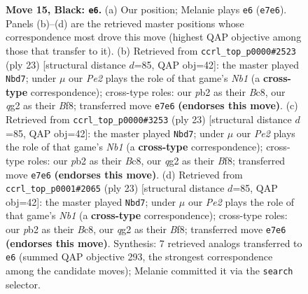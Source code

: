 \documentclass[11pt]{article}
\begin{document}
\begin{figure}[p]
\caption{\textbf{Move 15, Black: \texttt{e6}.} (a) Our position; Melanie plays \texttt{e6} (\texttt{e7e6}). Panels (b)--(d) are the retrieved master positions whose correspondence most drove this move (highest QAP objective among those that transfer to it). (b) Retrieved from \texttt{ccrl\_top\_p0000\#2523} (ply 23) [structural distance $d$=85, QAP obj=42]: the master played \texttt{Nbd7}; under $\mu$ our \emph{Pe2} plays the role of that game's \emph{Nb1} (a \textbf{cross-type} correspondence); cross-type roles: our \emph{p}b2 as their \emph{B}c8, our \emph{q}g2 as their \emph{B}f8; transferred move \texttt{e7e6} \textbf{(endorses this move)}. (c) Retrieved from \texttt{ccrl\_top\_p0000\#3253} (ply 23) [structural distance $d$=85, QAP obj=42]: the master played \texttt{Nbd7}; under $\mu$ our \emph{Pe2} plays the role of that game's \emph{Nb1} (a \textbf{cross-type} correspondence); cross-type roles: our \emph{p}b2 as their \emph{B}c8, our \emph{q}g2 as their \emph{B}f8; transferred move \texttt{e7e6} \textbf{(endorses this move)}. (d) Retrieved from \texttt{ccrl\_top\_p0001\#2065} (ply 23) [structural distance $d$=85, QAP obj=42]: the master played \texttt{Nbd7}; under $\mu$ our \emph{Pe2} plays the role of that game's \emph{Nb1} (a \textbf{cross-type} correspondence); cross-type roles: our \emph{p}b2 as their \emph{B}c8, our \emph{q}g2 as their \emph{B}f8; transferred move \texttt{e7e6} \textbf{(endorses this move)}. Synthesis: 7 retrieved analogs transferred to \texttt{e6} (summed QAP objective 293, the strongest correspondence among the candidate moves); Melanie committed it via the \texttt{search} selector.}
\label{fig:thought-m29}
\end{figure}

\clearpage
\end{document}
